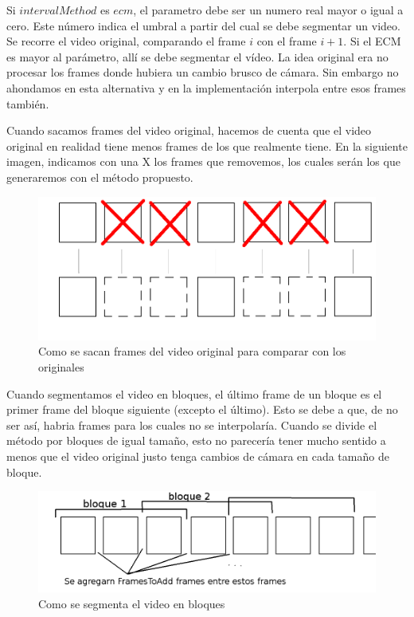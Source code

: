 \begin{itemize}
  Si $intervalMethod$ es $ecm$, el parametro debe ser un numero real mayor o igual a cero. Este número indica el umbral a partir del cual se debe segmentar un video. Se recorre el video original, comparando el frame $i$ con el frame $i+1$. Si el ECM es mayor al parámetro, allí se debe segmentar el vídeo. La idea original era no procesar los frames donde hubiera un cambio brusco de cámara. Sin embargo no ahondamos en esta alternativa y en la implementación interpola entre esos frames también.
\end{itemize}

Cuando sacamos frames del video original, hacemos de cuenta que el video original en realidad tiene menos frames de los que realmente tiene. En la siguiente imagen, indicamos con una X los frames que removemos, los cuales serán los que generaremos con el método propuesto.

\begin{figure}[h!]
  \centering
    \includegraphics[scale= 0.3]{imagenes/sacandoFrames.png}
  \caption{Como se sacan frames del video original para comparar con los originales}
\end{figure}

Cuando segmentamos el video en bloques, el último frame de un bloque es el primer frame del bloque siguiente (excepto el último). Esto se debe a que, de no ser así, habria frames para los cuales no se interpolaría. Cuando se divide el método por bloques de igual tamaño, esto no parecería tener mucho sentido a menos que el video original justo tenga cambios de cámara en cada tamaño de bloque.

\begin{figure}[h!]
  \centering
    \includegraphics[scale= 0.3]{imagenes/framesToAddBloques.png}
  \caption{Como se segmenta el video en bloques}
\end{figure}


